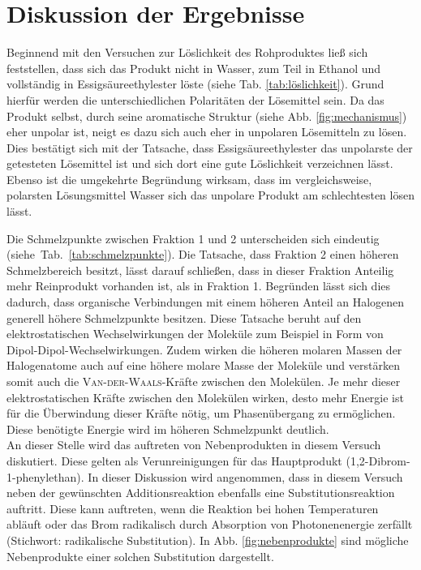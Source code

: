 \section{Diskussion der Ergebnisse}
\label{sec:diskussion}

Beginnend mit den Versuchen zur Löslichkeit des Rohproduktes ließ sich feststellen, dass sich das Produkt nicht in Wasser, zum Teil in Ethanol und vollständig in Essigsäureethylester löste (siehe Tab. \ref{tab:löslichkeit}). Grund hierfür werden die unterschiedlichen Polaritäten der Lösemittel sein. Da das Produkt selbst, durch seine aromatische Struktur (siehe Abb. \ref{fig:mechanismus}) eher unpolar ist, neigt es dazu sich auch eher in unpolaren Lösemitteln zu lösen. Dies bestätigt sich mit der Tatsache, dass Essigsäureethylester das unpolarste der getesteten Lösemittel ist und sich dort eine gute Löslichkeit verzeichnen lässt. Ebenso ist die umgekehrte Begründung wirksam, dass im vergleichsweise, polarsten Lösungsmittel Wasser sich das unpolare Produkt am schlechtesten lösen lässt.


Die Schmelzpunkte zwischen Fraktion 1 und 2 unterscheiden sich eindeutig \mbox{(siehe Tab. \ref{tab:schmelzpunkte})}. Die Tatsache, dass Fraktion 2 einen höheren Schmelzbereich besitzt, lässt darauf schließen, dass in dieser Fraktion Anteilig mehr Reinprodukt vorhanden ist, als in Fraktion 1. Begründen lässt sich dies dadurch, dass organische Verbindungen mit einem höheren Anteil an Halogenen generell höhere Schmelzpunkte besitzen. Diese Tatsache beruht auf den elektrostatischen Wechselwirkungen der Moleküle zum Beispiel in Form von Dipol-Dipol-Wechselwirkungen. Zudem wirken die höheren molaren Massen der Halogenatome auch auf eine höhere molare Masse der Moleküle und verstärken somit auch die \textsc{Van-der-Waals}-Kräfte zwischen den Molekülen. Je mehr dieser elektrostatischen Kräfte zwischen den Molekülen wirken, desto mehr Energie ist für die Überwindung dieser Kräfte nötig, um Phasenübergang zu ermöglichen. Diese benötigte Energie wird im höheren Schmelzpunkt deutlich.\\

An dieser Stelle wird das auftreten von Nebenprodukten in diesem Versuch diskutiert. Diese gelten als Verunreinigungen für das Hauptprodukt (1,2-Dibrom-1-phenylethan). In dieser Diskussion wird angenommen, dass in diesem Versuch neben der gewünschten Additionsreaktion ebenfalls eine Substitutionsreaktion auftritt. Diese kann auftreten, wenn die Reaktion bei hohen Temperaturen abläuft oder das Brom radikalisch durch Absorption von Photonenenergie zerfällt (Stichwort: radikalische Substitution). In Abb. \ref{fig:nebenprodukte} sind mögliche Nebenprodukte einer solchen Substitution dargestellt. \\
\newpage

